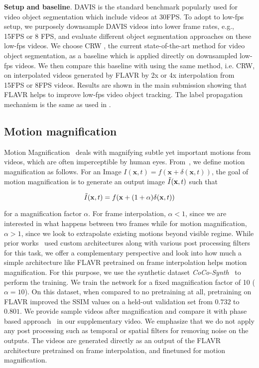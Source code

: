 \documentclass[10pt,twocolumn,letterpaper]{article}
\newcommand{\Ours}{FLAVR}
\begin{document}
{\bf Setup and baseline}. DAVIS is the standard benchmark popularly used for video object segmentation which include videos at 30FPS. To adopt to low-fps setup, we purposely downsample DAVIS videos into lower frame rates, e.g., 15FPS or 8 FPS, and evaluate different object segmentation approaches on these low-fps videos. We choose CRW \cite{jabri2020space}, the current state-of-the-art method for video object segmentation, as a baseline which is applied directly on downsampled low-fps videos. We then compare this baseline with using the same method, i.e. CRW, on interpolated videos generated by \Ours{} by 2x or 4x interpolation from 15FPS or 8FPS videos. Results are shown in the main submission showing that \Ours{} helps to improve low-fps video object tracking. The label propagation mechanism is the same as used in \cite{jabri2020space}.

\subsection{Motion magnification}
\label{appendix:motion_magnification}

Motion Magnification~\cite{oh2018learning, wu2012eulerian, Wadhwa13PhaseBased} deals with magnifying subtle yet important motions from videos, which are often imperceptible by human eyes. From~\cite{oh2018learning}, we define motion magnification as follows. For an Image $I(\mathbf{x},t) = f(\mathbf{x} + \delta(\mathbf{x} , t))$, the goal of motion magnification is to generate an output image $\Tilde{I}(\mathbf{x} , t)$ such that

\begin{equation}
    \Tilde{I}(\mathbf{x} , t) = f(\mathbf{x} +(1+\alpha) \delta(\mathbf{x} , t))
\end{equation}

\noindent for a magnification factor $\alpha$. For frame interpolation, $\alpha < 1$, since we are interested in what happens between two frames while for motion magnification, $\alpha > 1$, since we look to extrapolate existing motions beyond visible regime. While prior works~\cite{oh2018learning, wu2012eulerian, Wadhwa13PhaseBased} used custom architectures along with various post processing filters for this task, we offer a complementary perspective and look into how much a simple architecture like FLAVR pretrained on frame interpolation helps motion magnification. For this purpose, we use the synthetic dataset \textit{CoCo-Synth}~\cite{oh2018learning} to perform the training. We train the network for a fixed magnification factor of 10 ($\alpha=10$). On this dataset, when compared to no pretraining at all, pretraining on \Ours{} improved the SSIM values on a held-out validation set from $0.732$ to $0.801$. We provide sample videos after magnification and compare it with phase based approach~\cite{wu2012eulerian} in our supplementary video. We emphasize that we do not apply any post processing such as temporal or spatial filters for removing noise on the outputs. The videos are generated directly as an output of the FLAVR architecture pretrained on frame interpolation, and finetuned for motion magnification.
\end{document}

